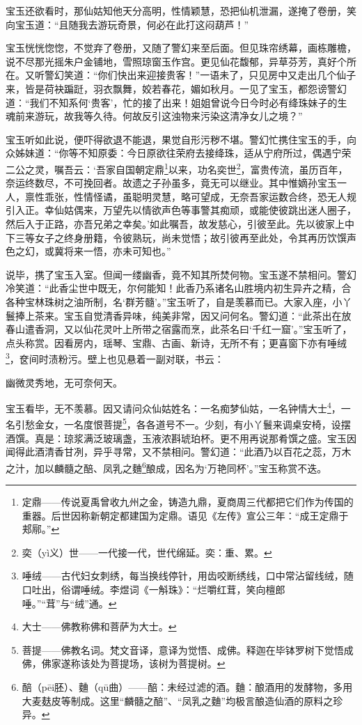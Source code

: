 \par 宝玉还欲看时，那仙姑知他天分高明，性情颖慧，恐把仙机泄漏，遂掩了卷册，笑向宝玉道：“且随我去游玩奇景，何必在此打这闷葫芦！”
\par 宝玉恍恍惚惚，不觉弃了卷册，又随了警幻来至后面。但见珠帘绣幕，画栋雕檐，说不尽那光摇朱户金铺地，雪照琼窗玉作宫。更见仙花馥郁，异草芬芳，真好个所在。又听警幻笑道：“你们快出来迎接贵客！”一语未了，只见房中又走出几个仙子来，皆是荷袂蹁跹，羽衣飘舞，姣若春花，媚如秋月。一见了宝玉，都怨谤警幻道：“我们不知系何‘贵客’，忙的接了出来！姐姐曾说今日今时必有绛珠妹子的生魂前来游玩，故我等久待。何故反引这浊物来污染这清净女儿之境？”
\par 宝玉听如此说，便吓得欲退不能退，果觉自形污秽不堪。警幻忙携住宝玉的手，向众姊妹道：“你等不知原委：今日原欲往荣府去接绛珠，适从宁府所过，偶遇宁荣二公之灵，嘱吾云：‘吾家自国朝定鼎\footnote{定鼎——传说夏禹曾收九州之金，铸造九鼎，夏商周三代都把它们作为传国的重器。后世因称新朝定都建国为定鼎。语见《左传》宣公三年：“成王定鼎于郏鄏。”}以来，功名奕世\footnote{奕（yì义）世——一代接一代，世代绵延。奕：重、累。}，富贵传流，虽历百年，奈运终数尽，不可挽回者。故遗之子孙虽多，竟无可以继业。其中惟嫡孙宝玉一人，禀性乖张，性情怪谲，虽聪明灵慧，略可望成，无奈吾家运数合终，恐无人规引入正。幸仙姑偶来，万望先以情欲声色等事警其痴顽，或能使彼跳出迷人圈子，然后入于正路，亦吾兄弟之幸矣。’如此嘱吾，故发慈心，引彼至此。先以彼家上中下三等女子之终身册籍，令彼熟玩，尚未觉悟；故引彼再至此处，令其再历饮馔声色之幻，或冀将来一悟，亦未可知也。”
\par 说毕，携了宝玉入室。但闻一缕幽香，竟不知其所焚何物。宝玉遂不禁相问。警幻冷笑道：“此香尘世中既无，尔何能知！此香乃系诸名山胜境内初生异卉之精，合各种宝林珠树之油所制，名‘群芳髓’。”宝玉听了，自是羡慕而已。大家入座，小丫鬟捧上茶来。宝玉自觉清香异味，纯美非常，因又问何名。警幻道：“此茶出在放春山遣香洞，又以仙花灵叶上所带之宿露而烹，此茶名曰‘千红一窟’。”宝玉听了，点头称赏。因看房内，瑶琴、宝鼎、古画、新诗，无所不有；更喜窗下亦有唾绒\footnote{唾绒——古代妇女刺绣，每当换线停针，用齿咬断绣线，口中常沾留线绒，随口吐出，俗谓唾绒。李煜词《一斛珠》：“烂嚼红茸，笑向檀郎唾。”“茸”与“绒”通。}，奁间时渍粉污。壁上也见悬着一副对联，书云：
\par 幽微灵秀地，无可奈何天。
\par 宝玉看毕，无不羡慕。因又请问众仙姑姓名：一名痴梦仙姑，一名钟情大士\footnote{大士——佛教称佛和菩萨为大士。}，一名引愁金女，一名度恨菩提\footnote{菩提——佛教名词。梵文音译，意译为觉悟、成佛。释迦在毕钵罗树下觉悟成佛，佛家遂称该处为菩提场，该树为菩提树。}，各各道号不一。少刻，有小丫鬟来调桌安椅，设摆酒馔。真是：琼浆满泛玻璃盏，玉液浓斟琥珀杯。更不用再说那肴馔之盛。宝玉因闻得此酒清香甘冽，异乎寻常，又不禁相问。警幻道：“此酒乃以百花之蕊，万木之汁，加以麟髓之醅、凤乳之麯\footnote{醅（pēi胚）、麯（qū曲）——醅：未经过滤的酒。麯：酿酒用的发酵物，多用大麦麸皮等制成。这里“麟髓之醅”、“凤乳之麯”均极言酿造仙酒的原料之珍异。}酿成，因名为‘万艳同杯’。”宝玉称赏不迭。
